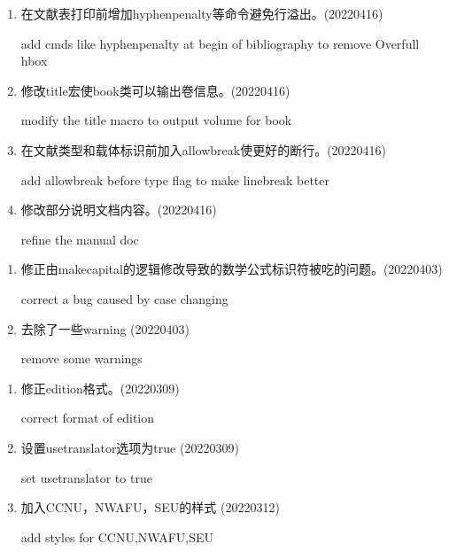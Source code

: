 \label{up:20220416}
\begin{enumerate}

\item 在文献表打印前增加hyphenpenalty等命令避免行溢出。(20220416)

add cmds like hyphenpenalty at begin of bibliography to remove Overfull hbox

\item 修改title宏使book类可以输出卷信息。(20220416)

modify the title macro to output volume for book

\item 在文献类型和载体标识前加入allowbreak使更好的断行。(20220416)

add allowbreak before type flag to make linebreak better

\item 修改部分说明文档内容。(20220416)

refine the manual doc

\end{enumerate}


\label{up:20220403}
\begin{enumerate}

\item 修正由makecapital的逻辑修改导致的数学公式标识符被吃的问题。(20220403)

correct a bug caused by case changing

\item 去除了一些warning (20220403)

remove some warnings


\end{enumerate}



\label{up:20220313}
\begin{enumerate}

\item 修正edition格式。(20220309)

correct format of edition

\item 设置usetranslator选项为true (20220309)

set usetranslator to true

\item 加入CCNU，NWAFU，SEU的样式 (20220312)

add styles for CCNU,NWAFU,SEU

\end{enumerate}



